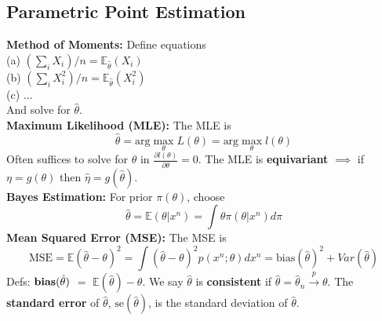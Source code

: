 \documentclass[10pt,twocolumn]{article}
\begin{document}
\subsection*{Parametric Point Estimation}
\textbf{Method of Moments:} Define equations\\
(a) \hspace{3mm} $(\sum_{i} X_{i})/n = \mathbb{E}_{\hat{\theta}}(X_{i})$\\
(b) \hspace{3mm} $(\sum_{i} X_{i}^{2})/n = \mathbb{E}_{\hat{\theta}}(X_{i}^{2})$\\
(c) \hspace{3mm} $\ldots$ \\
And solve for $\hat{\theta}$.\\
\textbf{Maximum Likelihood (MLE):} The MLE is
\begin{equation}
\hat{\theta} = \text{arg}\max_{\theta} L(\theta) = \text{arg}\max_{\theta} l(\theta)
\end{equation}
Often suffices to solve for $\theta$ in $\frac{\partial l(\theta)}{\partial \theta} = 0$.
The MLE is \textbf{equivariant} $\implies$ if $\eta = g(\theta)$ then $\hat{\eta} = g(\hat{\theta})$. \\
\textbf{Bayes Estimation:} For prior $\pi(\theta)$, choose 
\begin{equation}
    \hat{\theta} = \mathbb{E}(\theta|x^{n}) = \int \theta \pi(\theta|x^{n}) d\pi
\end{equation}
\textbf{Mean Squared Error (MSE):} The MSE is
\begin{equation}
    \text{MSE} = \mathbb{E}(\hat{\theta} - \theta)^{2} = \int (\hat{\theta}-\theta)^{2} p(x^{n};\theta)dx^{n} = \text{bias}({\hat{\theta}})^{2} + Var(\hat{\theta})
\end{equation}
Defs: $\text{\textbf{bias}}(\hat{\theta})$ $=$ $\mathbb{E}(\hat{\theta}) - \theta$. We say $\hat{\theta}$ is \textbf{consistent} if $\hat{\theta} = \hat{\theta}_{n} \xrightarrow{p} \theta$. The \textbf{standard error} of $\hat{\theta}$, $\text{se}(\hat{\theta})$, is the standard deviation of $\hat{\theta}$.\\
\end{document}
